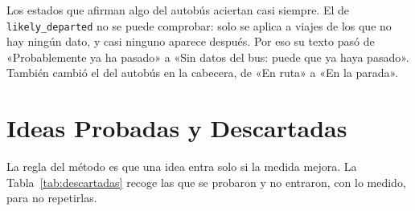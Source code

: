 Los estados que afirman algo del autobús aciertan casi siempre. El de \texttt{likely\_departed} no se puede comprobar:
solo se aplica a viajes de los que no hay ningún dato, y casi ninguno aparece después. Por eso su texto pasó de
«Probablemente ya ha pasado» a «Sin datos del bus: puede que ya haya pasado». También cambió el del autobús en la
cabecera, de «En ruta» a «En la parada».

\section{Ideas Probadas y Descartadas}
\label{sec:descartadas}

La regla del método es que una idea entra solo si la medida mejora. La Tabla~\ref{tab:descartadas} recoge las que se
probaron y no entraron, con lo medido, para no repetirlas.

